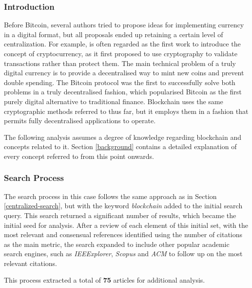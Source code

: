 \documentclass[../access.tex]{subfiles}
\begin{document}
\subsubsection{Introduction}
\label{3_slr_decentralized}
Before Bitcoin, several authors tried to propose ideas for implementing currency in a digital format, but all proposals ended up retaining a certain level of centralization. For example, \cite{Chaum1982} is often regarded as the first work to introduce the concept of cryptocurrency, as it first proposed to use cryptography to validate transactions rather than protect them. The main technical problem of a truly digital currency is to provide a decentralised way to mint new coins and prevent double spending. The Bitcoin protocol was the first to successfully solve both problems in a truly decentralised fashion, which popularised Bitcoin as the first purely digital alternative to traditional finance. Blockchain uses the same cryptographic methods referred to thus far, but it employs them in a fashion that permits fully decentralised applications to operate.
\par
The following analysis assumes a degree of knowledge regarding blockchain and concepts related to it. Section \ref{background} contains a detailed explanation of every concept referred to from this point onwards.

\subsubsection{Search Process}
The search process in this case follows the same approach as in Section \ref{centralized-search}, but with the keyword \textit{blockchain} added to the initial search query. This search returned a significant number of results, which became the initial seed for analysis. After a review of each element of this initial set, with the most relevant and consensual references identified using the number of citations as the main metric, the search expanded to include other popular academic search engines, such as \textit{IEEExplorer}, \textit{Scopus} and \textit{ACM} to follow up on the most relevant citations.
\par
This process extracted a total of \textbf{75} articles for additional analysis.
\end{document}
